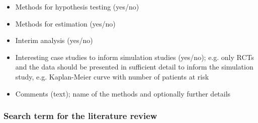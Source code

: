 \begin{itemize}
\item  Methods for hypothesis testing (yes/no)

\item  Methods for estimation (yes/no)

\item  Interim analysis (yes/no)

\item  Interesting case studies to inform simulation studies (yes/no); e.g. only RCTs and the data should be presented in sufficient detail to inform the simulation study, e.g. Kaplan-Meier curve with number of patients at risk

\item  Comments (text); name of the methods and optionally further details
\end{itemize}
\newpage
\subsubsection{Search term for the literature review} \label{searchterm}

\noindent

